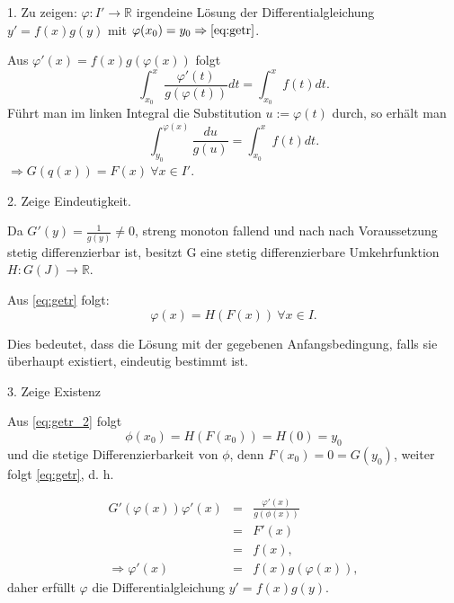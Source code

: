 \documentclass[10pt]{scrbook}
\begin{document}
\begin{bew}
1. Zu zeigen: $\varphi: I'\rightarrow \mathbb{R}$ irgendeine Lösung der Differentialgleichung $y'=f(x) g(y)$ mit $\varphi(x_0)=y_0\Rightarrow \eqref{eq:getr}$.

Aus $\varphi'(x)=f(x) g(\varphi(x))$ folgt
\begin{displaymath}
\int_{x_0}^x \frac{\varphi'(t)}{g(\varphi(t))} dt = \int_{x_0}^x f(t) dt.
\end{displaymath}
Führt man im linken Integral die Substitution $u:=\varphi(t)$ durch, so erhält man
\begin{displaymath}
\int_{y_0}^{\varphi(x)} \frac{du}{g(u)} = \int_{x_0}^x f(t) dt.
\end{displaymath}
$\Rightarrow G(q(x))=F(x)\ \forall x\in I'$.

2. Zeige Eindeutigkeit.

Da $G'(y)=\frac{1}{g(y)}\neq 0$, streng monoton fallend und nach nach Voraussetzung stetig differenzierbar ist, besitzt G eine stetig differenzierbare Umkehrfunktion $H:G(J)\rightarrow \mathbb{R}$.

Aus \eqref{eq:getr} folgt:
\begin{equation}
\varphi(x)=H(F(x))\ \forall x\in I. \label{eq:getr_2}
\end{equation}

Dies bedeutet, dass die Lösung mit der gegebenen Anfangsbedingung, falls sie überhaupt existiert, eindeutig bestimmt ist.

3. Zeige Existenz

Aus \eqref{eq:getr_2} folgt
\begin{displaymath}
\phi(x_0)=H(F(x_0))=H(0)=y_0 
\end{displaymath}
und die stetige Differenzierbarkeit von $\phi$, denn $F(x_0)=0=G(y_0)$, weiter folgt \eqref{eq:getr}, d. h.

\begin{eqnarray*}
G'(\varphi(x)) \varphi'(x) & = & \frac{\varphi'(x)}{g(\phi(x))} \\
& = & F'(x) \\
& = & f(x), \\
\Rightarrow \varphi'(x) & = & f(x)g(\varphi(x)),
\end{eqnarray*}
daher erfüllt $\varphi$ die Differentialgleichung $y'=f(x) g(y)$.
\end{bew}
\end{document}
